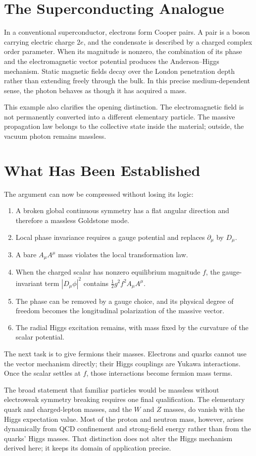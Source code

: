 \section{The Superconducting Analogue}

In a conventional superconductor, electrons form Cooper pairs. A pair is a
boson carrying electric charge \(2e\), and the condensate is described by a
charged complex order parameter. When its magnitude is nonzero, the
combination of its phase and the electromagnetic vector potential produces
the Anderson--Higgs mechanism. Static magnetic fields decay over the London
penetration depth rather than extending freely through the bulk. In this
precise medium-dependent sense, the photon behaves as though it has acquired
a mass.

This example also clarifies the opening distinction. The electromagnetic
field is not permanently converted into a different elementary particle.
The massive propagation law belongs to the collective state inside the
material; outside, the vacuum photon remains massless.

\section{What Has Been Established}

The argument can now be compressed without losing its logic:
\begin{enumerate}
  \item A broken global continuous symmetry has a flat angular direction and
        therefore a massless Goldstone mode.
  \item Local phase invariance requires a gauge potential and replaces
        \(\partial_\mu\) by \(D_\mu\).
  \item A bare \(A_\mu A^\mu\) mass violates the local transformation law.
  \item When the charged scalar has nonzero equilibrium magnitude \(f\), the
        gauge-invariant term \(|D_\mu\phi|^2\) contains
        \(\frac12g^2f^2A_\mu A^\mu\).
  \item The phase can be removed by a gauge choice, and its physical degree
        of freedom becomes the longitudinal polarization of the massive
        vector.
  \item The radial Higgs excitation remains, with mass fixed by the curvature
        of the scalar potential.
\end{enumerate}

The next task is to give fermions their masses. Electrons and quarks cannot
use the vector mechanism directly; their Higgs couplings are Yukawa
interactions. Once the scalar settles at \(f\), those interactions become
fermion mass terms.

The broad statement that familiar particles would be massless without
electroweak symmetry breaking requires one final qualification. The
elementary quark and charged-lepton masses, and the \(W\) and \(Z\) masses,
do vanish with the Higgs expectation value. Most of the proton and neutron
mass, however, arises dynamically from QCD confinement and strong-field
energy rather than from the quarks' Higgs masses. That distinction does not
alter the Higgs mechanism derived here; it keeps its domain of application
precise.
